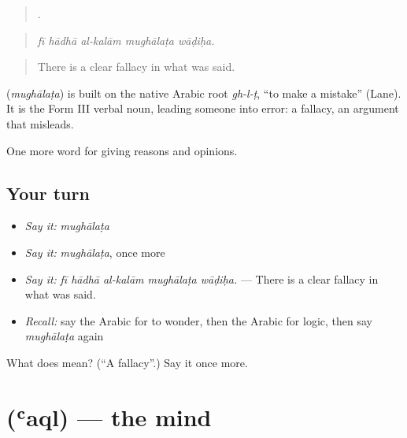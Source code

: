 \begin{quote}
    .
\end{quote}

\begin{quote}
\emph{fī hādhā al-kalām mughālaṭa wāḍiḥa.}
\end{quote}

\begin{quote}
There is a clear fallacy in what was said.
\end{quote}

\begin{cousinweb}
\textbf{} (\emph{mughālaṭa}) is built on the native Arabic root \emph{gh-l-ṭ}, \textquotedblleft{}to make a mistake\textquotedblright{} (Lane). It is the Form III verbal noun, leading someone into error: a fallacy, an argument that misleads.
\end{cousinweb}

\begin{grammarlens}[title={What you've built}]
One more word for giving reasons and opinions.
\end{grammarlens}

\subsection*{Your turn}
\begin{itemize}
\raggedright
  \item \emph{Say it:} \emph{mughālaṭa}
  \item \emph{Say it:} \emph{mughālaṭa}, once more
  \item \emph{Say it:} \emph{fī hādhā al-kalām mughālaṭa wāḍiḥa.} — There is a clear fallacy in what was said.
  \item \emph{Recall:} say the Arabic for to wonder, then the Arabic for logic, then say \emph{mughālaṭa} again
\end{itemize}

\begin{tcolorbox}[breakable,colback=teal!4,colframe=teal!35!black,title={Before you move on}]
What does  mean? (\textquotedblleft{}A fallacy\textquotedblright{}.) Say it once more.
\end{tcolorbox}
\section[\texorpdfstring{\ar{عقل} (ʿaql)}{عقل (ʿaql)}]{ (ʿaql) — the mind}

